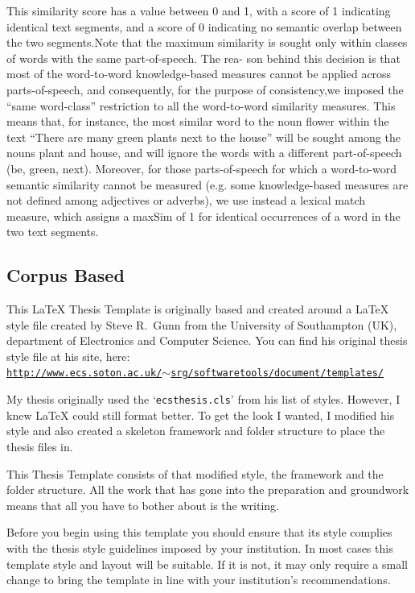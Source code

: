   This similarity score has a value between 0 and 1, with a score of 1 indicating identical text segments, and a score of 0 indicating no semantic overlap between the two segments.Note that the maximum similarity is sought only within classes of words with the same part-of-speech. The rea-
son behind this decision is that most of the word-to-word knowledge-based measures cannot be applied across parts-of-speech, and consequently, for the purpose of consistency,we imposed the “same word-class” restriction to all the word-to-word similarity measures. This means that, for instance, the most similar word to the noun flower within the text “There are many green plants next to the house” will be sought among the nouns plant and house, and will ignore the words with a different part-of-speech (be, green, next). Moreover, for those parts-of-speech for which a word-to-word semantic similarity cannot be measured (e.g. some knowledge-based measures are not defined among adjectives or adverbs), we use instead a lexical match measure,
which assigns a maxSim of 1 for identical occurrences of a word in the two text segments.


\subsection{Corpus Based}

This \LaTeX{} Thesis Template is originally based and created around a \LaTeX{} style file created by Steve R.\ Gunn from the University of Southampton (UK), department of Electronics and Computer Science. You can find his original thesis style file at his site, here:\\
\href{http://www.ecs.soton.ac.uk/~srg/softwaretools/document/templates/}{\texttt{http://www.ecs.soton.ac.uk/$\sim$srg/softwaretools/document/templates/}}

My thesis originally used the `\texttt{ecsthesis.cls}' from his list of styles. However, I knew \LaTeX{} could still format better. To get the look I wanted, I modified his style and also created a skeleton framework and folder structure to place the thesis files in.

This Thesis Template consists of that modified style, the framework and the folder structure. All the work that has gone into the preparation and groundwork means that all you have to bother about is the writing.

Before you begin using this template you should ensure that its style complies with the thesis style guidelines imposed by your institution. In most cases this template style and layout will be suitable. If it is not, it may only require a small change to bring the template in line with your institution's recommendations.

